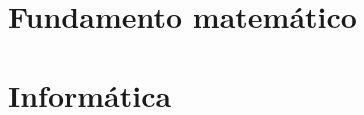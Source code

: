 \documentclass[print, color, tikz]{ugrTFG}
\begin{document}
\maketitle

\frontmatter %

   
            

                    
               

\mainmatter %

\part{Fundamento matemático} %



%


\cleardoublepage\part{Informática}






\appendix %
\end{document}
